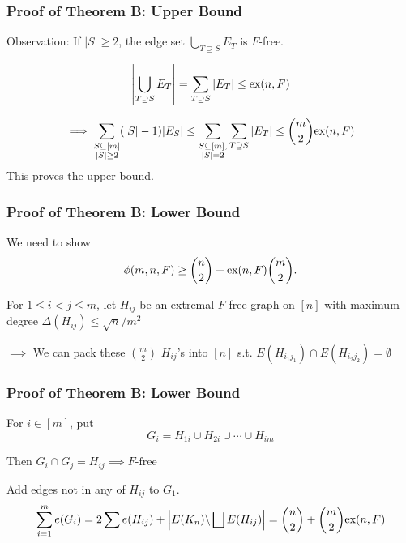 \documentclass{beamer}
\newcommand*{\ex}{\textnormal{ex}}
\begin{document}
\begin{frame}
  \frametitle{Proof of Theorem B: Upper Bound}

  Observation: If $|S| \geq 2$, the edge set $\bigcup_{T \supseteq S} E_T$ is $F$-free.

  \pause

  \vspace{0.3cm}

  \[
    \left|\bigcup_{T \supseteq S} E_T\right| = \sum_{T \supseteq S} |E_T| \leq \ex(n, F)
  \]
  \pause

  \vspace{0.3cm}

  \[
    \implies \sum_{\substack{S \subseteq [m] \\ |S| \geq 2}} (|S| - 1)|E_S| \leq \sum_{\substack{S \subseteq [m], \\ |S| = 2}} \sum_{T \supseteq S} |E_T| \leq \binom{m}{2}\ex(n, F)
  \]
  This proves the upper bound.
\end{frame}

\begin{frame}
  \frametitle{Proof of Theorem B: Lower Bound}

  We need to show
  \[  
    \phi(m, n ,F) \geq \binom{n}{2} + \ex(n, F)\binom{m}{2}.  
  \]

  \pause
  \vspace{0.3cm}

  For $1 \leq i < j \leq m$, let $H_{ij}$ be an extremal $F$-free graph on $[n]$ with maximum degree $\Delta(H_{ij}) \leq \sqrt{n}/m^2$

  \pause

  \vspace{0.5cm}

  $\implies$ We can pack these $\binom{m}{2}$ $H_{ij}$'s into $[n]$ s.t. $E(H_{i_1j_1}) \cap E(H_{i_2j_2}) = \emptyset$
\end{frame}

\begin{frame}
  \frametitle{Proof of Theorem B: Lower Bound}

  For $i \in [m]$, put 
  \[
    G_i = H_{1i} \cup H_{2i} \cup \cdots \cup H_{im}
  \]
  \pause

  Then $G_i \cap G_j = H_{ij} \implies F\text{-free}$

  \pause

  \vspace{0.7cm}

  Add edges not in any of $H_{ij}$ to $G_1$.
  \[
    \sum_{i = 1}^m e(G_i) = 2\sum e(H_{ij}) + \left|E(K_n)\backslash \bigsqcup E(H_{ij})\right| = \binom{n}{2} + \binom{m}{2}\ex(n, F)
  \]
\end{frame}
\end{document}
